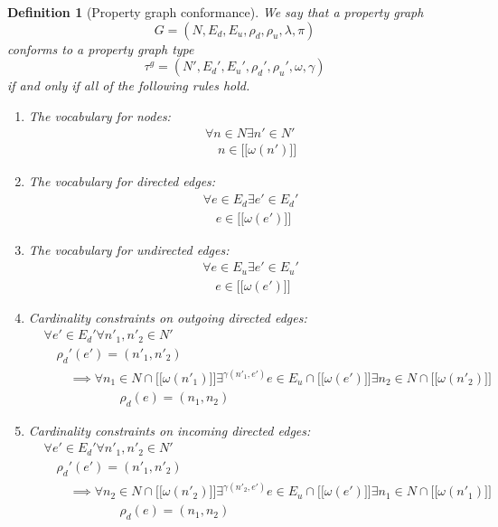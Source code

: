 \documentclass[a4paper]{article}
\newtheorem{definition}[theorem]{Definition}
\newcommand{\gtype}{\tau^g}
\newcommand{\lsem}{\ensuremath{[\![}}
\newcommand{\rsem}{\ensuremath{]\!]}}
\newcommand{\sem}[1]{\ensuremath{\lsem #1 \rsem}}
\begin{document}
\begin{definition}[Property graph conformance]
  We say that a property graph \[G = (N, E_d, E_u, \rho_d, \rho_u, \lambda, \pi)\] \emph{conforms} to a property graph type \[\gtype = (N', E_d', E_u', \rho_d', \rho_u', \omega, \gamma)\] if and only if all of the following rules hold.

  \begin{enumerate}
    \item The vocabulary for nodes:
    \begin{align*}
      &\forall n \in N \exists n' \in N'\\
      &\quad n \in \sem{\omega(n')}
    \end{align*}
    
    \item The vocabulary for directed edges:
    \begin{align*}
      &\forall e \in E_d \exists e' \in E_d'\\
      &\quad e \in \sem{\omega(e')}
    \end{align*}

    \item The vocabulary for undirected edges:
    \begin{align*}
      &\forall e \in E_u \exists e' \in E_u'\\
      &\quad e \in \sem{\omega(e')}
    \end{align*}
    
    \item Cardinality constraints on outgoing directed edges:
    \begin{align*}
      &\forall e' \in E_d' \forall n'_1, n'_2 \in N'\\
      &\quad\rho_d'(e') = (n'_1, n'_2)\\
      &\quad\quad\implies {} \forall n_1 \in N \cap \sem{\omega(n'_1)} \exists^{\gamma(n'_1, e')} e \in E_u \cap \sem{\omega(e')} \exists n_2 \in N \cap \sem{\omega(n'_2)}\\
      &\quad\quad\quad\quad\quad\quad\rho_d(e) = (n_1, n_2)
    \end{align*}

    \item Cardinality constraints on incoming directed edges:
    \begin{align*}
      &\forall e' \in E_d' \forall n'_1, n'_2 \in N'\\
      &\quad\rho_d'(e') = (n'_1, n'_2)\\
      &\quad\quad\implies {} \forall n_2 \in N \cap \sem{\omega(n'_2)} \exists^{\gamma(n'_2, e')} e \in E_u \cap \sem{\omega(e')} \exists n_1 \in N \cap \sem{\omega(n'_1)}\\
      &\quad\quad\quad\quad\quad\quad\rho_d(e) = (n_1, n_2)
    \end{align*}
    

\end{enumerate}
\end{definition}
\end{document}
